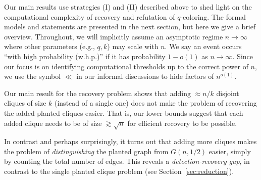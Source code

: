 \documentclass{article}
\begin{document}
Our main results use strategies (I) and (II) described above to shed light on the computational complexity of recovery and refutation of $q$-coloring. The formal models and statements are presented in the next section, but here we give a brief overview. Throughout, we will implicitly assume an asymptotic regime $n \to \infty$ where other parameters (e.g., $q, k$) may scale with $n$. We say an event occurs ``with high probability (w.h.p.)'' if it has probability $1-o(1)$ as $n \to \infty$. Since our focus is on identifying computational thresholds up to the correct power of $n$, we use the symbol $\ll$ in our informal discussions to hide factors of $n^{o(1)}$.

Our main result for the recovery problem shows that adding $\approx n/k$ disjoint cliques of size $k$ (instead of a single one) does not make the problem of recovering the added planted cliques easier. That is, our lower bounds suggest that each added clique needs to be of size  $\gtrsim \sqrt{n}$ for efficient recovery to be possible. 

In contrast and perhaps surprisingly, it turns out that adding more cliques makes the problem of \emph{distinguishing} the planted graph from $G(n,1/2)$ easier, simply by counting the total number of edges. This reveals a \emph{detection-recovery gap}, in contrast to the single planted clique problem (see Section~\ref{sec:reduction}).
\end{document}
